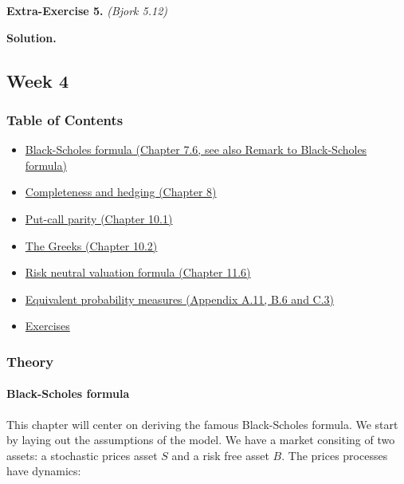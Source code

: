 \documentclass[
]{article}
\begin{document}
\textbf{Extra-Exercise 5.} \emph{(Bjork 5.12)}

\textbf{Solution.}

\hypertarget{week-4}{%
\subsection{Week 4}\label{week-4}}

\hypertarget{table-of-contents-3}{%
\subsubsection{Table of Contents}\label{table-of-contents-3}}

\begin{itemize}
\item
  \protect\hyperlink{black-scholes-formula}{Black-Scholes formula
  (Chapter 7.6, see also Remark to Black-Scholes formula)}
\item
  \protect\hyperlink{completeness-and-hedging}{Completeness and hedging
  (Chapter 8)}
\item
  \protect\hyperlink{put-call-parity}{Put-call parity (Chapter 10.1)}
\item
  \protect\hyperlink{the-greeks}{The Greeks (Chapter 10.2)}
\item
  \protect\hyperlink{risk-neutral-valuation-formula}{Risk neutral
  valuation formula (Chapter 11.6)}
\item
  \protect\hyperlink{equivalent-probability-measures}{Equivalent
  probability measures (Appendix A.11, B.6 and C.3)}
\item
  \protect\hyperlink{exercises-week-4}{Exercises}
\end{itemize}

\hypertarget{theory-3}{%
\subsubsection{Theory}\label{theory-3}}

\hypertarget{black-scholes-formula}{%
\paragraph{Black-Scholes formula}\label{black-scholes-formula}}

This chapter will center on deriving the famous Black-Scholes formula.
We start by laying out the assumptions of the model. We have a market
consiting of two assets: a stochastic prices asset \(S\) and a risk free
asset \(B\). The prices processes have dynamics:
\end{document}
